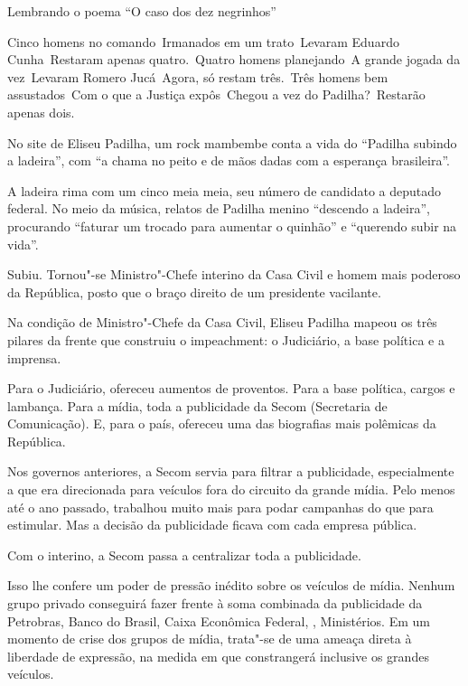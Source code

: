  

Lembrando o poema ``O caso dos dez negrinhos''

 

\epigraph{Cinco homens no comando\ Irmanados em um trato\ Levaram Eduardo
Cunha\ Restaram apenas quatro.\ Quatro homens planejando\ A grande
jogada da vez\ Levaram Romero Jucá\ Agora, só restam três.\ Três
homens bem assustados\ Com o que a Justiça expôs\ Chegou a vez do
Padilha?\ Restarão apenas dois.}{} 

 

 

No site de Eliseu Padilha, um rock mambembe conta a vida do ``Padilha
subindo a ladeira'', com ``a chama no peito e de mãos dadas com a
esperança brasileira''.

A ladeira rima com um cinco meia meia, seu número de candidato a
deputado federal. No meio da música, relatos de Padilha menino
``descendo a ladeira'', procurando ``faturar um trocado para aumentar o
quinhão'' e ``querendo subir na vida''.

Subiu. Tornou"-se Ministro"-Chefe interino da Casa Civil e homem mais
poderoso da República, posto que o braço direito de um presidente
vacilante.

Na condição de Ministro"-Chefe da Casa Civil, Eliseu Padilha mapeou os
três pilares da frente que construiu o impeachment: o Judiciário, a base
política e a imprensa.

Para o Judiciário, ofereceu aumentos de proventos. Para a base política,
cargos e lambança. Para a mídia, toda a publicidade da Secom (Secretaria
de Comunicação). E, para o país, ofereceu uma das biografias mais
polêmicas da República.

Nos governos anteriores, a Secom servia para filtrar a publicidade,
especialmente a que era direcionada para veículos fora do circuito da
grande mídia. Pelo menos até o ano passado, trabalhou muito mais para
podar campanhas do que para estimular. Mas a decisão da publicidade
ficava com cada empresa pública.

Com o interino, a Secom passa a centralizar toda a publicidade.

Isso lhe confere um poder de pressão inédito sobre os veículos de mídia.
Nenhum grupo privado conseguirá fazer frente à soma combinada da
publicidade da Petrobras, Banco do Brasil, Caixa Econômica Federal,
, Ministérios. Em um momento de crise dos grupos de mídia, trata"-se
de uma ameaça direta à liberdade de expressão, na medida em que
constrangerá inclusive os grandes veículos.

